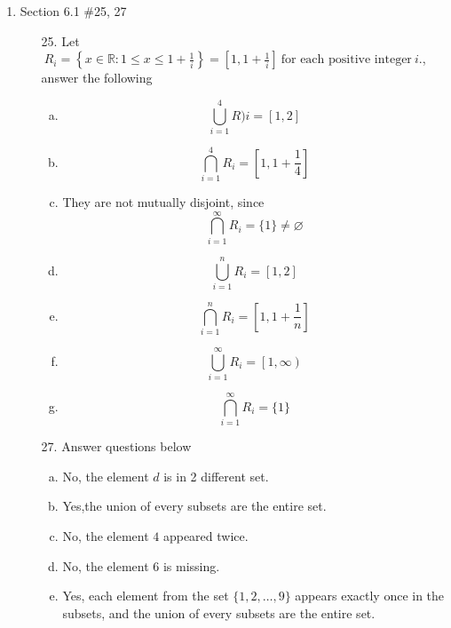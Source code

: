 \documentclass[12pt]{article}
\newcommand{\sqbkt}[1]{\left[ #1 \right]}
\newcommand{\union}[2]{\bigcup_{#1}^{#2}}
\newcommand{\inter}[2]{\bigcap_{#1}^{#2}}
\newcommand{\closeopen}[1]{\left[ #1 \right)}
\begin{document}
\begin{enumerate}
\begin{enumerate}
        \end{enumerate}

    \newpage
    \item Section 6.1 \#25, 27
        \begin{enumerate}
            \item[25.] Let  \( \ R_i = \left\{ x \in \mathbb{R} : 1 \leq x \leq 1 + \frac{1}{i} \right\} = \left[1, 1 + \frac{1}{i}\right] \ \text{for each positive integer} \ i.\), answer the following
                \begin{enumerate}[a.]
                    \item 
                    \[
                    \union{i=1}{4}R)i = \sqbkt{1,2}
                    \]
                    \item 
                    \[
                    \inter{i=1}{4}R_i = \sqbkt{1,1+\frac{1}{4}}
                    \]
                    \item They are not mutually disjoint, since
                    \[
                    \inter{i=1}{\infty}R_i = \{ 1\} \neq \varnothing
                    \]
                    \item 
                    \[
                    \union{i=1}{n}R_i = \sqbkt{1,2}
                    \]
                    \item
                    \[
                    \inter{i=1}{n}R_i = \sqbkt{1,1+\frac{1}{n}}
                    \]
                    \item
                    \[
                    \union{i=1}{\infty}R_i = \closeopen{1,\infty}
                    \]
                    \item
                    \[
                    \inter{i=1}{\infty}R_i = \{ 1\}
                    \]

                \end{enumerate}


            \item[27.] Answer questions below
                \begin{enumerate}[a.]
                    \item No, the element $d$ is in 2 different set. 
                    \item Yes,the union of every subsets are the entire set.
                    \item No, the element $4$ appeared twice.
                    \item No, the element $6$ is missing.
                    \item Yes, each element from the set $\{1,2,\ldots,9\}$ appears exactly once in the subsets, and the union of every subsets are the entire set. 
                \end{enumerate}
            

\end{enumerate}
\end{enumerate}
\end{document}
